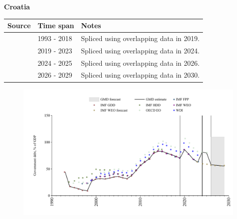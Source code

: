 \documentclass[12pt,a4paper,landscape]{article}
\begin{document}
\begin{adjustbox}{max totalsize={\paperwidth}{\paperheight},center}
\begin{minipage}[t][\textheight][t]{\textwidth}
\vspace*{0.5cm}
{}
\begin{center}
{\Large\bfseries Croatia}
\end{center}
\vspace{0.5cm}
\begin{table}[H]
\centering
\small
\begin{tabular}{|l|l|l|}
\hline
\textbf{Source} & \textbf{Time span} & \textbf{Notes} \\
\hline
\rowcolor{white}\cite{IMF_GDD}& 1993 - 2018 &Spliced using overlapping data in 2019.\\
\rowcolor{lightgray}\cite{IMF_FPP}& 2019 - 2023 &Spliced using overlapping data in 2024.\\
\rowcolor{white}\cite{OECD_EO}& 2024 - 2025 &Spliced using overlapping data in 2026.\\
\rowcolor{lightgray}\cite{IMF_WEO_forecast}& 2026 - 2029 &Spliced using overlapping data in 2030.\\
\hline
\end{tabular}
\end{table}
\begin{figure}[H]
\centering
\includegraphics[width=\textwidth,height=0.6\textheight,keepaspectratio]{graphs/HRV_govdebt_GDP.pdf}
\end{figure}
\end{minipage}
\end{adjustbox}
\end{document}
